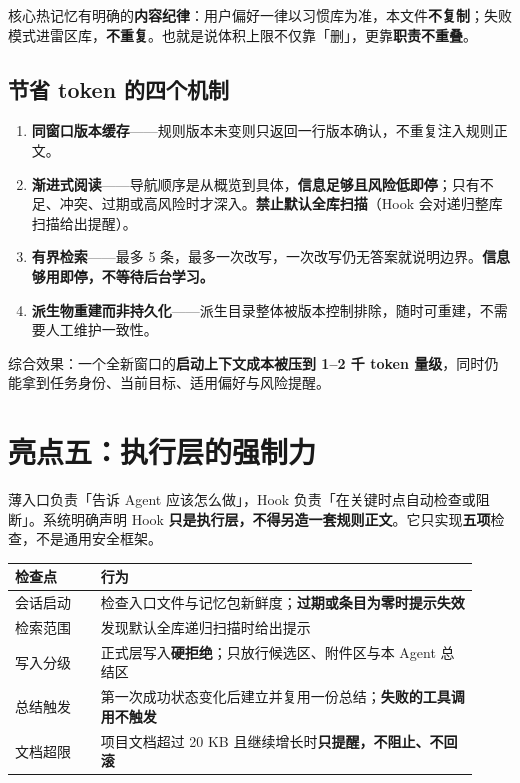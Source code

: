 \documentclass[11pt,a4paper]{ctexart}
\begin{document}
核心热记忆有明确的\textbf{内容纪律}：用户偏好一律以习惯库为准，本文件\textbf{不复制}；失败模式进雷区库，\textbf{不重复}。也就是说体积上限不仅靠「删」，更靠\textbf{职责不重叠}。

\subsection{节省 token 的四个机制}

\begin{enumerate}
  \item \textbf{同窗口版本缓存}——规则版本未变则只返回一行版本确认，不重复注入规则正文。
  \item \textbf{渐进式阅读}——导航顺序是从概览到具体，\textbf{信息足够且风险低即停}；只有不足、冲突、过期或高风险时才深入。\textbf{禁止默认全库扫描}（Hook 会对递归整库扫描给出提醒）。
  \item \textbf{有界检索}——最多 5 条，最多一次改写，一次改写仍无答案就说明边界。\textbf{信息够用即停，不等待后台学习。}
  \item \textbf{派生物重建而非持久化}——派生目录整体被版本控制排除，随时可重建，不需要人工维护一致性。
\end{enumerate}

综合效果：一个全新窗口的\textbf{启动上下文成本被压到 1--2 千 token 量级}，同时仍能拿到任务身份、当前目标、适用偏好与风险提醒。

\section{亮点五：执行层的强制力}

薄入口负责「告诉 Agent 应该怎么做」，Hook 负责「在关键时点自动检查或阻断」。系统明确声明 Hook \textbf{只是执行层，不得另造一套规则正文}。它只实现\textbf{五项}检查，不是通用安全框架。

\begin{center}
\begin{tabular}{@{}p{0.17\linewidth}p{0.75\linewidth}@{}}
\toprule
\textbf{检查点} & \textbf{行为} \\
\midrule
会话启动 & 检查入口文件与记忆包新鲜度；\textbf{过期或条目为零时提示失效} \\
检索范围 & 发现默认全库递归扫描时给出提示 \\
写入分级 & 正式层写入\textbf{硬拒绝}；只放行候选区、附件区与本 Agent 总结区 \\
总结触发 & 第一次成功状态变化后建立并复用一份总结；\textbf{失败的工具调用不触发} \\
文档超限 & 项目文档超过 20 KB 且继续增长时\textbf{只提醒，不阻止、不回滚} \\
\bottomrule
\end{tabular}
\end{center}
\end{document}
